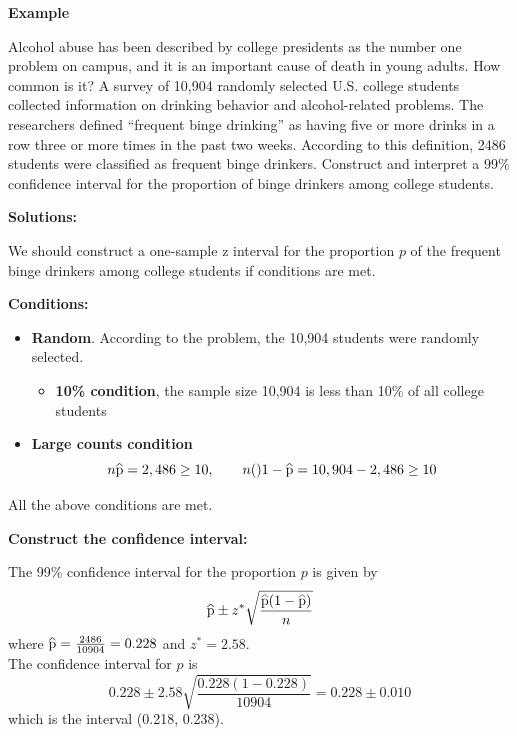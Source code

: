 \documentclass[a4paper, 12pt,twoside]{book}
\newcommand\reallywidehat[1]{%
\savestack{\tmpbox}{\stretchto{%
  \scaleto{%
    \scalerel*[\widthof{\ensuremath{#1}}]{\kern-.6pt\bigwedge\kern-.6pt}%
    {\rule[-\textheight/2]{1ex}{\textheight}}%
  }{\textheight}%
}{0.5ex}}%
\stackon[1pt]{#1}{\tmpbox}%
}
\begin{document}
\begin{itemize}
    \newpage
    
\hspace{-1cm}    
\colorbox{champagne}{\parbox{\textwidth}{
\textbf{Example}\vspace{0.3cm}

Alcohol abuse has been described by college presidents as the number one problem on campus, and it is an important cause of death in young adults. How common is it? A survey of 10,904 randomly selected U.S. college students collected information on drinking behavior and alcohol-related problems. The researchers defined “frequent binge drinking” as having five or more drinks in a row three or more times in the past two weeks. According to this definition, 2486 students were classified as frequent binge drinkers. Construct and interpret a 99\% confidence interval for the proportion of binge drinkers among college students.\vspace{0.3cm}

\textbf{Solutions:}\vspace{0.3cm}

We should construct a one-sample z interval for the proportion $p$ of the frequent binge drinkers among college students if conditions are met.\vspace{0.6cm}

\textbf{Conditions:}
   \begin{itemize}
       \item \textbf{Random}. According to the problem, the 10,904 students were randomly selected.
       \begin{itemize}
          \item \textbf{10\% condition}, the sample size 10,904 is less than 10\% of all college students
       \end{itemize}
       \item \textbf{Large counts condition}
       $$n\reallywidehat{p}= 2, 486 \geq 10,  \qquad n()1-\reallywidehat{p} = 10,904 - 2,486 \geq 10$$
   \end{itemize}
   All the above conditions are met.\vspace{0.6cm}
   
   \textbf{Construct the confidence interval:}\vspace{0.3cm}
   
   The 99\% confidence interval for the proportion $p$ is given by 
   $$\reallywidehat{p} \pm z^* \sqrt{\frac{\reallywidehat{p}(1-\reallywidehat{p})}{n}}$$
   where $\reallywidehat{p} = \frac{2486}{10904} = 0.228$ and $z^* = 2.58$. \\
   The confidence interval for $p$ is 
   $$0.228 \pm 2.58\sqrt{\frac{0.228(1-0.228)}{10904}} = 0.228 \pm 0.010$$
   which is the interval (0.218, 0.238).\vspace{0.3cm}
   
}}
\end{itemize}
\end{document}
